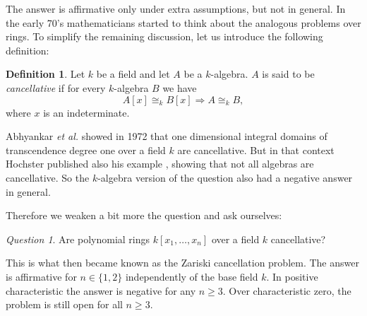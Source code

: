 \documentclass[A4paper, 12pt, british, reqno]{amsart}
\theoremstyle{plain}
\theoremstyle{definition}
\newtheorem{defn}[thm]{Definition}
\theoremstyle{remark}
\newtheorem{q}[thm]{Question}
\theoremstyle{plain}
\theoremstyle{definition}
\theoremstyle{remark}
\theoremstyle{plain}
\theoremstyle{definition}
\theoremstyle{remark}
\begin{document}
The answer is affirmative only under extra assumptions, but not in general.
In the early 70's mathematicians started to think about the analogous problems over rings.
To simplify the remaining discussion, let us introduce the following definition:

\begin{defn}
    Let $k$ be a field and let $A$ be a $k$-algebra.
    $A$ is said to be \textit{cancellative} if for every $k$-algebra $B$ we have
    \[ A[x]\cong_{k}B[x]\Rightarrow A\cong_{k} B, \]
    where $x$ is an indeterminate.
\end{defn}

Abhyankar \textit{et al.} showed in 1972 that one dimensional integral domains of transcendence degree one over a field $k$ are cancellative.
But in that context Hochster published also his example \cite{hoc72}, showing that not all algebras are cancellative.
So the $k$-algebra version of the question also had a negative answer in general.

Therefore we weaken a bit more the question and ask ourselves:

\begin{q}
    Are polynomial rings $k[x_{1},\ldots,x_{n}]$ over a field $k$ cancellative?
\end{q}

This is what then became known as the Zariski cancellation problem.
The answer is affirmative for $n\in \{1,2\}$ independently of the base field $k$.
In positive characteristic the answer is negative for any $n\geqslant 3$.
Over characteristic zero, the problem is still open for all $n\geqslant 3$.



\vfill
\end{document}
